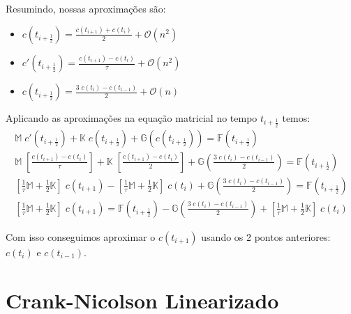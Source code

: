 \documentclass[a4paper]{article}
\begin{document}
Resumindo, nossas aproximações são:
\begin{itemize}
\item \(
    c(t_{i+\frac12})
    =
    \frac{c(t_{i+1}) + c(t_i)}{2}
    + \mathcal{O}(n^2)
\)
\item \(
    c'(t_{i+\frac12})
    =
    \frac{c(t_{i+1}) - c(t_i)}{\tau}
    + \mathcal{O}(n^2)
\)
\item \(
    c(t_{i+\frac12})
    =
    \frac{3 \; c(t_i) - c(t_{i-1})}{2}
    + \mathcal{O}(n)
\)
\end{itemize}

Aplicando as aproximações na equação matricial
no tempo \(t_{i+\frac12}\)
temos:
\[ \begin{array}{l} \displaystyle
    \mathbb{M} \; c'(t_{i+\frac12})
    + \mathbb{K} \; c(t_{i+\frac12})
    + \mathbb{G}(c(t_{i+\frac12}))
    = \mathbb{F}\left( t_{i+\frac12} \right)
    \\[3ex] \displaystyle
    \mathbb{M} \; \left[ \frac{c(t_{i+1}) - c(t_i)}{\tau} \right]
    + \mathbb{K} \; \left[ \frac{c(t_{i+1}) - c(t_i)}{2} \right]
    + \mathbb{G}\left( \frac{3 \; c(t_i) - c(t_{i-1})}{2} \right)
    = \mathbb{F}\left( t_{i+\frac12} \right)
    \\[3ex] \displaystyle
    \left[ \frac1\tau \mathbb{M} + \frac12 \mathbb{K} \right] \; c(t_{i+1})
    - \left[ \frac1\tau \mathbb{M} + \frac12 \mathbb{K} \right] \; c(t_i)
    + \mathbb{G}\left( \frac{3 \; c(t_i) - c(t_{i-1})}{2} \right)
    = \mathbb{F}\left( t_{i+\frac12} \right)
    \\[3ex] \displaystyle
    \left[ \frac1\tau \mathbb{M} + \frac12 \mathbb{K} \right] \; c(t_{i+1})
    = \mathbb{F}\left( t_{i+\frac12} \right)
    - \mathbb{G}\left( \frac{3 \; c(t_i) - c(t_{i-1})}{2} \right)
    + \left[ \frac1\tau \mathbb{M} + \frac12 \mathbb{K} \right] \; c(t_i)
\end{array} \]

Com isso conseguimos aproximar o
\(c(t_{i+1})\) usando os 2 pontos anteriores:
\(c(t_i)\) e \(c(t_{i-1})\).

\section{Crank-Nicolson Linearizado}
\end{document}
